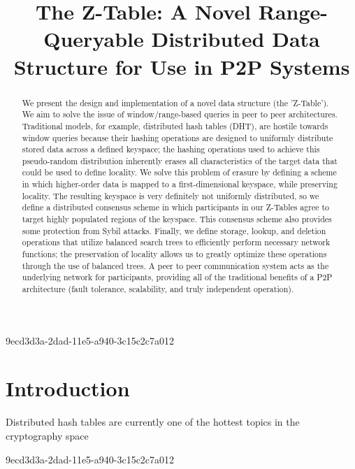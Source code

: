 \documentclass[12pt]{article}
\title{The Z-Table: A Novel Range-Queryable Distributed Data Structure for Use in P2P Systems}
\begin{document}
9ecd3d3a-2dad-11e5-a940-3c15c2c7a012\maketitle

\begin{abstract}
We present the design and implementation of a novel data structure (the 'Z-Table'). We aim to solve the issue of window/range-based queries in peer to peer architectures. Traditional models, for example,  distributed hash tables (DHT), are hostile towards window queries because their hashing operations are designed to uniformly distribute stored data across a defined keyspace; the hashing operations used to achieve this pseudo-random distribution inherently erases all characteristics of the target data that could be used to define locality. We solve this problem of erasure by defining a scheme in which higher-order data is mapped to a first-dimensional keyspace, while preserving locality. The resulting keyspace is very definitely not uniformly distributed, so we define a distributed consensus scheme in which participants in our Z-Tables agree to target highly populated regions of the keyspace. This consensus scheme also provides some protection from Sybil attacks. Finally, we define storage, lookup, and deletion operations that utilize balanced search trees to efficiently perform necessary network functions; the preservation of locality allows us to greatly optimize these operations through the use of balanced trees. A peer to peer communication system acts as the underlying network for participants, providing all of the traditional benefits of a P2P architecture (fault tolerance, scalability, and truly independent operation).
\end{abstract}


\newpage
\section{Introduction}
Distributed hash tables are currently one of the hottest topics in the cryptography space~\cite{Stoica:2001dj,Rowstron:2001ea,Ratnasamy:2001wn}

9ecd3d3a-2dad-11e5-a940-3c15c2c7a012\printbibliography
\end{document}
